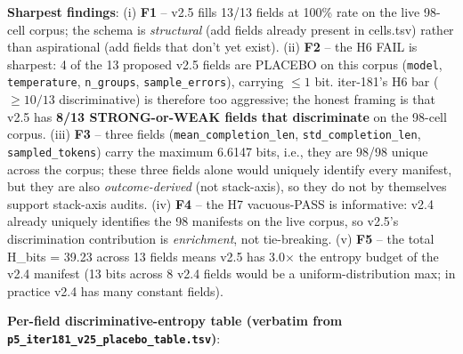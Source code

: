 \documentclass{article}  \usepackage[preprint,nonatbib]{neurips_2026} \usepackage[numbers]{natbib}
\begin{document}
\noindent\textbf{Sharpest findings}: (i) \textbf{F1} -- v2.5 fills 13/13 fields
at 100\% rate on the live 98-cell corpus; the schema is \emph{structural}
(add fields already present in cells.tsv) rather than aspirational
(add fields that don't yet exist). (ii) \textbf{F2} -- the H6 FAIL is
sharpest: 4 of the 13 proposed v2.5 fields are PLACEBO on this corpus
(\texttt{model}, \texttt{temperature}, \texttt{n\_groups},
\texttt{sample\_errors}), carrying $\leq 1$ bit. iter-181's H6 bar
($\geq 10/13$ discriminative) is therefore too aggressive; the honest
framing is that v2.5 has \textbf{8/13 STRONG-or-WEAK fields that
discriminate} on the 98-cell corpus. (iii) \textbf{F3} -- three fields
(\texttt{mean\_completion\_len}, \texttt{std\_completion\_len},
\texttt{sampled\_tokens}) carry the maximum 6.6147 bits, i.e., they
are 98/98 unique across the corpus; these three fields alone would
uniquely identify every manifest, but they are also \emph{outcome-derived}
(not stack-axis), so they do not by themselves support stack-axis audits.
(iv) \textbf{F4} -- the H7 vacuous-PASS is informative: v2.4 already
uniquely identifies the 98 manifests on the live corpus, so v2.5's
discrimination contribution is \emph{enrichment}, not tie-breaking.
(v) \textbf{F5} -- the total H\_bits = 39.23 across 13 fields means
v2.5 has 3.0$\times$ the entropy budget of the v2.4 manifest
(13 bits across 8 v2.4 fields would be a uniform-distribution max;
in practice v2.4 has many constant fields).

\noindent\textbf{Per-field discriminative-entropy table (verbatim from
\texttt{p5\_iter181\_v25\_placebo\_table.tsv})}:
\end{document}
